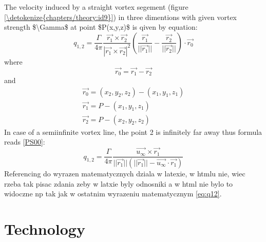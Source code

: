 \documentclass[letterpaper,10pt,english]{jupyterBook}
\begin{document}
\sphinxAtStartPar
The velocity induced by a straight vortex segement (figure \hyperref[\detokenize{chapters/theory:id9}]{\ref{\detokenize{chapters/theory:id9}}}) in three dimentions with given vortex strength \$\textbackslash{}Gamma\$ at point \$P(x,y,z)\$ is qiven by equation:
\label{equation:chapters/theory:58a44f7b-7737-4cce-ab01-fc9054bfd312}\begin{equation}
\label{eq:q12}
q_{1,2} = \frac{\Gamma}{4\pi}\frac{\overrightarrow{r_1} \times \overrightarrow{r_2}}{|\overrightarrow{r_1} \times \overrightarrow{r_2}|^2} \left(\frac{\overrightarrow{r_1}}{||\overrightarrow{r_1}||} - \frac{\overrightarrow{r_2}}{||\overrightarrow{r_2}||}\right) \cdot\overrightarrow{r_0}
\end{equation}
\sphinxAtStartPar
where
\label{equation:chapters/theory:9d118334-5810-40d3-8fc8-1b855eae0d07}\begin{equation}
\overrightarrow{r_{0}} = \overrightarrow{r_1} - \overrightarrow{r_2}
\end{equation}
\sphinxAtStartPar
and
\label{equation:chapters/theory:cda939b1-2a1b-4b3c-9087-d88575861473}\begin{gather}
\overrightarrow{r_{0}} = (x_2, y_2, z_2) - (x_1, y_1, z_1) \\
\overrightarrow{r_{1}} = P - (x_1, y_1, z_1)\\
\overrightarrow{r_{2}} = P - (x_2, y_2, z_2)
\end{gather}
\sphinxAtStartPar
In case of a semi\sphinxhyphen{}infinite vortex line, the point 2 is infinitely far away thus formula reads {[}\hyperlink{cite.chapters/bibliography:id6}{PS00}{]}:
\label{equation:chapters/theory:59c102ad-605b-4455-8c38-ed1aed1d0a90}\begin{equation}
\label{q12_inf}
q_{1,2} = \frac{\Gamma}{4\pi}\frac{\overrightarrow{u_\infty} \times \overrightarrow{r_1}}{||\overrightarrow{r_1}||(||\overrightarrow{r_1}|| - \overrightarrow{u_\infty} \cdot \overrightarrow{r_1})} 
\end{equation}
\sphinxAtStartPar
Referencing do wyrazen matematycznych dziala w latexie, w htmlu nie, wiec rzeba tak pisac zdania zeby w latxie byly odnosniki a w html nie bylo to widoczne np tak jak w ostatnim wyrazeniu matematycznym \ref{eq:q12}.

\sphinxstepscope


\chapter{Technology}
\label{\detokenize{chapters/technology:technology}}\label{\detokenize{chapters/technology::doc}}
\sphinxstepscope
\end{document}
